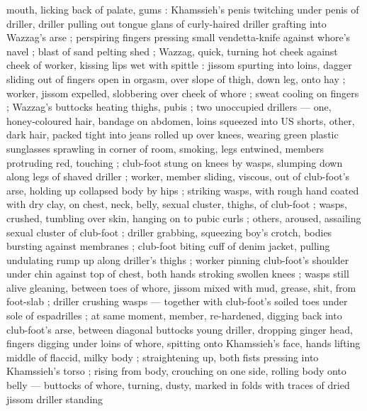 mouth, licking back of palate, gums : Khamssieh's penis twitching under penis of driller, driller pulling out tongue {\slashsemi} glans of curly-haired driller grafting into Wazzag's arse ; perspiring fingers pressing small vendetta-knife against whore's navel ; blast of sand pelting shed ; Wazzag, quick, turning hot cheek against cheek of worker, kissing lips wet with spittle : jissom spurting into loins, dagger sliding out of fingers open in orgasm, over slope of thigh, down leg, onto hay ; worker, jissom expelled, slobbering over cheek of whore ; sweat cooling on fingers ; Wazzag's buttocks heating thighs, pubis ; two unoccupied drillers --- one, honey-coloured hair, bandage on abdomen, loins squeezed into US shorts, other, dark hair, packed tight into jeans rolled up over knees, wearing green plastic sunglasses {\dashcom} sprawling in corner of room, smoking, legs entwined, members protruding red, touching ; club-foot stung on knees by wasps, slumping down along legs of shaved driller ; worker, member sliding, viscous, out of club-foot's arse, holding up collapsed body by hips ; striking wasps, with rough hand coated with dry clay, on chest, neck, belly, sexual cluster, thighs, of club-foot ; wasps, crushed, tumbling over skin, hanging on to pubic curls ; others, aroused, assailing sexual cluster of club-foot ; driller grabbing, squeezing boy's crotch, bodies bursting against membranes ; club-foot biting cuff of denim jacket, pulling undulating rump up along driller's thighs ; worker pinning club-foot's shoulder under chin against top of chest, both hands stroking swollen knees ; wasps still alive gleaning, between toes of whore, jissom mixed with mud, grease, shit, from foot-slab ; driller crushing wasps --- together with club-foot's soiled toes {\dashcom} under sole of espadrilles ; at same moment, member, re-hardened, digging back into club-foot's arse, between diagonal buttocks {\semislash} young driller, dropping ginger head, fingers digging under loins of whore, spitting onto Khamssieh's face, hands lifting middle of flaccid, milky body ; straightening up, both fists pressing into Khamssieh's torso ; rising from body, crouching on one side, rolling body onto belly --- buttocks of whore, turning, dusty, marked in folds with traces of dried jissom {\dashcom} driller standing 
